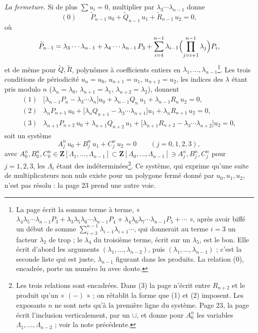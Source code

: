 \documentclass[11pt,a4paper]{article}
\begin{document}
\emph{La fermeture.} Si de plus $\sum u_i = 0$, multiplier par
$\lambda_3 \cdots \lambda_{n-1}$ donne
\[
  (0) \qquad \widetilde{P}_{n-1}\, u_0 + \widetilde{Q}_{n-1}\, u_1
  + \widetilde{R}_{n-1}\, u_2 = 0 ,
\]
où
\[
  \widetilde{P}_{n-1} = \lambda_3 \cdots \lambda_{n-1}
  + \lambda_4 \cdots \lambda_{n-1}\, P_3
  + \sum_{i=4}^{n-1} \lambda_{i-1} \Bigl( \prod_{j=i+1}^{n-1} \lambda_j \Bigr) P_i ,
\]
et de même pour $\widetilde{Q}, \widetilde{R}$, polynômes à coefficients
entiers en $\lambda_1, \ldots, \lambda_{n-1}$\footnote{La page écrit la somme
terme à terme, « $\lambda_4 \lambda_5 \cdots \lambda_{n-1} P_3 + \lambda_3
\lambda_5 \lambda_6 \cdots \lambda_{n-1} P_4 + \lambda_4 \lambda_6 \lambda_7
\cdots \lambda_{n-1} P_5 + \cdots$ », après avoir biffé un début de somme
$\sum_{i=3}^{n-1} \lambda_{i-1} \lambda_{i+1} \cdots$, qui donnerait au terme
$i = 3$ un facteur $\lambda_2$ de trop ; le $\lambda_4$ du troisième terme,
écrit sur un $\lambda_5$, est le bon. Elle écrit d'abord les arguments
$(\lambda_1, \ldots, \lambda_{n-2})$, puis $(\lambda_1, \ldots,
\lambda_{n-1})$ ; c'est la seconde liste qui est juste, $\lambda_{n-1}$
figurant dans les produits. La relation (0), encadrée, porte un numéro lu avec
doute.}. Les trois conditions de périodicité $u_n = u_0$, $u_{n+1} = u_1$,
$u_{n+2} = u_2$, les indices des $\lambda$ étant pris modulo $n$
($\lambda_n = \lambda_0$, $\lambda_{n+1} = \lambda_1$, $\lambda_{n+2} =
\lambda_2$), donnent
\[
  \begin{array}{ll}
  (1) & \bigl[ \lambda_{n-1} P_n - \lambda_3 \cdots \lambda_n \bigr] u_0
    + \lambda_{n-1} Q_n\, u_1 + \lambda_{n-1} R_n\, u_2 = 0 , \\[2pt]
  (2) & \lambda_n P_{n+1}\, u_0
    + \bigl[ \lambda_n Q_{n+1} - \lambda_3 \cdots \lambda_{n+1} \bigr] u_1
    + \lambda_n R_{n+1}\, u_2 = 0 , \\[2pt]
  (3) & \lambda_{n+1} P_{n+2}\, u_0 + \lambda_{n+1} Q_{n+2}\, u_1
    + \bigl[ \lambda_{n+1} R_{n+2} - \lambda_3 \cdots \lambda_{n+2} \bigr] u_2 = 0 ,
  \end{array}
\]
soit un système
\[
  A_j^n\, u_0 + B_j^n\, u_1 + C_j^n\, u_2 = 0 \qquad (j = 0, 1, 2, 3),
\]
avec $A_0^n, B_0^n, C_0^n \in \mathbf{Z}[\Lambda_1, \ldots, \Lambda_{n-1}]
\subset \mathbf{Z}[\Lambda_0, \ldots, \Lambda_{n-1}] \ni A_j^n, B_j^n, C_j^n$
pour $j = 1, 2, 3$, les $\Lambda_i$ étant des indéterminées\footnote{Les trois
relations sont encadrées. Dans (3) la page n'écrit entre $R_{n+2}$ et le
produit qu'un « $(-)$ » ; on rétablit la forme que (1) et (2) imposent. Les
exposants $n$ ne sont nets qu'à la première ligne du système. Page 23, la
page écrit l'inclusion verticalement, par un $\cup$, et donne pour $A_0^n$ les
variables $\Lambda_1, \ldots, \Lambda_{n-2}$ ; voir la note précédente.}. Ce
système, qui exprime qu'une suite de multiplicateurs non nuls existe pour un
polygone fermé donné par $u_0, u_1, u_2$, n'est pas résolu : la page 23 prend
une autre voie.
\end{document}
